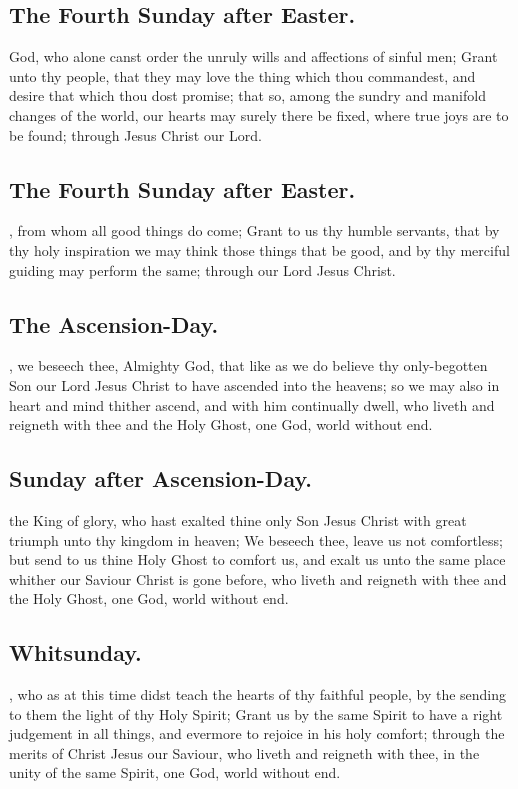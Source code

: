 \subsection{The Fourth Sunday after Easter.}
 God, who alone canst order the unruly wills and affections of sinful men; Grant unto thy people, that they may love the thing which thou commandest, and desire that which thou dost promise; that so, among the sundry and manifold changes of the world, our hearts may surely there be fixed, where true joys are to be found; through Jesus Christ our Lord.

\subsection{The Fourth Sunday after Easter.}
, from whom all good things do come; Grant to us thy humble servants, that by thy holy inspiration we may think those things that be good, and by thy merciful guiding may perform the same; through our Lord Jesus Christ.

\subsection{The Ascension-Day.}
, we beseech thee, Almighty God, that like as we do believe thy only-begotten Son our Lord Jesus Christ to have ascended into the heavens; so we may also in heart and mind thither ascend, and with him continually dwell, who liveth and reigneth with thee and the Holy Ghost, one God, world without end.

\subsection{Sunday after Ascension-Day.}
 the King of glory, who hast exalted thine only Son Jesus Christ with great triumph unto thy kingdom in heaven; We beseech thee, leave us not comfortless; but send to us thine Holy Ghost to comfort us, and exalt us unto the same place whither our Saviour Christ is gone before, who liveth and reigneth with thee and the Holy Ghost, one God, world without end.

\subsection{Whitsunday.}
, who as at this time didst teach the hearts of thy faithful people, by the sending to them the light of thy Holy Spirit; Grant us by the same Spirit to have a right judgement in all things, and evermore to rejoice in his holy comfort; through the merits of Christ Jesus our Saviour, who liveth and reigneth with thee, in the unity of the same Spirit, one God, world without end.

